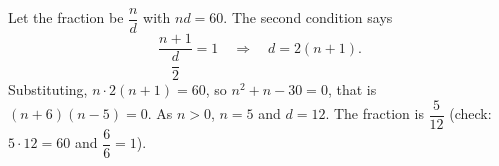 Let the fraction be $\dfrac{n}{d}$ with $nd=60$. The second condition says
\[
\dfrac{n+1}{\dfrac{d}{2}}=1\quad\Longrightarrow\quad d=2(n+1).
\]
Substituting, $n\cdot2(n+1)=60$, so $n^2+n-30=0$, that is $(n+6)(n-5)=0$. As $n>0$, $n=5$ and $d=12$. The fraction is $\boxed{\dfrac{5}{12}}$ (check: $5\cdot12=60$ and $\dfrac{6}{6}=1$).
